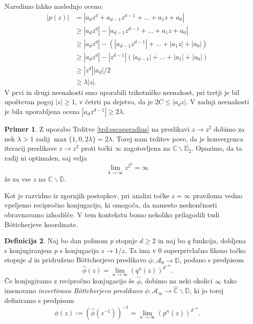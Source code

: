 \documentclass[12pt,a4paper]{amsart}
\theoremstyle{definition} %
\newtheorem{definicija}{Definicija}[section]
\newtheorem{primer}[definicija]{Primer}
\theoremstyle{plain} %
\newcommand{\CC}{\mathbb C}
\newcommand{\CCinf} {\hat{\CC}} %
\newcommand{\D}{\mathbb D} %
\newcommand{\A}{\mathscr A} %
\begin{document}
\proof
Naredimo lahko naslednjo oceno:
\begin{align*}
|p(z)| &= |a_d z^d + a_{d-1} z^{d-1} + \dots + a_1 z + a_0|   \\
&\geq |a_d z^d| - |a_{d-1} z^{d-1} + \dots + a_1 z + a_0|  \\
&\geq |a_d z^d| - (|a_{d-1}z^{d-1}| + \dots + |a_1 z| + |a_0|)  \\
&\geq |a_d z^d| - |z^{d-1}|\left(|a_{d-1}|+ \dots + |a_1| + |a_0|\right) \\
&\geq |z^d| |a_d| / 2 \\ 
&\geq \lambda |z|.
\end{align*}
V prvi in drugi neenakosti smo uporabili trikotniško neenakost,
pri tretji je bil upoštevan pogoj $|z| \geq 1$, 
v četrti pa dejstvo, da je $2C \leq |a_d z|$.
V zadnji neenakosti je bila uporabljena ocena $|a_dz^{d-1}| \geq 2\lambda$.
\endproof

\begin{primer}
Z uporabo Trditve \ref{trd:escaperadius} na preslikavi $z \to z^2$ 
dobimo za nek $\lambda>1$ radij $\max\{1, 0, 2\lambda\} = 2\lambda$.
Torej nam trditev pove, da je konvergenca iteracij preslikave $z \to z^2$ proti točki $\infty$ zagotovljena na $\CC \smallsetminus \overline{\D_2}$.
Opazimo, da ta radij ni optimalen, saj velja 
$$\lim_{k\to\infty} z^{2^k} = \infty$$
že za vse $z$ na $\CC \smallsetminus \overline{\D}$. 
\end{primer}
\vskip 2mm

Kot je razvidno iz zgornjih postopkov, 
pri analizi točke $z=\infty$ praviloma vedno vpeljemo recipročno konjugacijo,
ki omogoča, da namesto neskončnosti obravnavamo izhodišče. 
V tem kontekstu bomo nekoliko prilagodili tudi B{\"o}ttcherjeve koordinate.

\begin{definicija}\label{def:invertedBottcherMap}
Naj bo dan polinom $p$ stopnje $d\geq2$ in naj bo $q$ funkcija, dobljena s konjugiranjem $p$ s konjugacijo $z \to 1/z$.
Ta ima v $0$ superprivlačno fiksno točko stopnje $d$ in pridruženo B{\"o}ttcherjevo preslikavo $\hat{\phi} \colon \A_0 \to \D$,
podano s predpisom $$\hat{\phi}(z) = \lim_{n\to\infty}(q^n(z))^{d^{-n}}.$$
Če konjugiramo z recipročno konjugacijo še $\hat{\phi}$, dobimo na neki okolici $\infty$ tako imenovano {\em invertirano B{\"o}ttcherjevo preslikavo}
$\phi \colon \A_\infty \to \CCinf\smallsetminus\overline{\D}$, ki jo torej definiramo s predpisom
$$\phi(z) := (\hat{\phi}(z^{-1}))^{-1} = \lim_{n\to\infty}(p^n(z))^{d^{-n}}.$$
\end{definicija}
\end{document}
